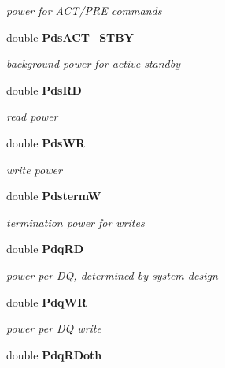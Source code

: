 \begin{CompactItemize}
\begin{CompactList}\small\item\em power for ACT/PRE commands \item\end{CompactList}\item 
double {\bf PdsACT\_\-STBY}\label{class_d_r_a_m_sim_i_i_1_1power_config_31e44c4cbb79fc4b8ff0aacd4b998088}

\begin{CompactList}\small\item\em background power for active standby \item\end{CompactList}\item 
double {\bf PdsRD}\label{class_d_r_a_m_sim_i_i_1_1power_config_82781dad79187c3b5d646e63ffcfd510}

\begin{CompactList}\small\item\em read power \item\end{CompactList}\item 
double {\bf PdsWR}\label{class_d_r_a_m_sim_i_i_1_1power_config_8e752ebe416c9d8cf624586d5d0ed38c}

\begin{CompactList}\small\item\em write power \item\end{CompactList}\item 
double {\bf PdstermW}\label{class_d_r_a_m_sim_i_i_1_1power_config_e0a71110e8ec4f65f7d05bce4807c6a3}

\begin{CompactList}\small\item\em termination power for writes \item\end{CompactList}\item 
double {\bf PdqRD}\label{class_d_r_a_m_sim_i_i_1_1power_config_1de1ab1e4b661793a4801d0c7df44eff}

\begin{CompactList}\small\item\em power per DQ, determined by system design \item\end{CompactList}\item 
double {\bf PdqWR}\label{class_d_r_a_m_sim_i_i_1_1power_config_a7d40dd445661ca47a3c0afec71465a9}

\begin{CompactList}\small\item\em power per DQ write \item\end{CompactList}\item 
double {\bf PdqRDoth}\label{class_d_r_a_m_sim_i_i_1_1power_config_db4beb624ac1a5cf8e98b0119d9f7915}


\end{CompactItemize}
